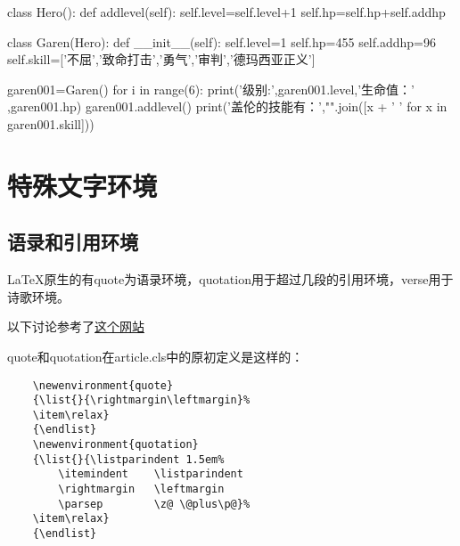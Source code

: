 \documentclass[11pt,oneside]{book}
\begin{document}
  \begin{tcbpython}[]
    class Hero():
    def addlevel(self):
    self.level=self.level+1
    self.hp=self.hp+self.addhp

    class Garen(Hero):
    def __init__(self):
    self.level=1
    self.hp=455
    self.addhp=96
    self.skill=['不屈','致命打击','勇气','审判','德玛西亚正义']

    garen001=Garen()
    for i in range(6):
    print('级别:',garen001.level,'生命值：' ,garen001.hp)
    garen001.addlevel()
    print('盖伦的技能有：',"".join([x + '  ' for x in garen001.skill]))
  \end{tcbpython}



  \chapter{特殊文字环境}
  \section{语录和引用环境}
  \LaTeX 原生的有quote为语录环境，quotation用于超过几段的引用环境，verse用于诗歌环境。

  以下讨论参考了\href{http://tex.stackexchange.com/questions/33219/whats-the-difference-between-the-environments-quote-and-quotation}{这个网站}

  quote和quotation在article.cls中的原初定义是这样的：
  \begin{Verbatim}
    \newenvironment{quote}
    {\list{}{\rightmargin\leftmargin}%
    \item\relax}
    {\endlist}
    \newenvironment{quotation}
    {\list{}{\listparindent 1.5em%
        \itemindent    \listparindent
        \rightmargin   \leftmargin
        \parsep        \z@ \@plus\p@}%
    \item\relax}
    {\endlist}
  \end{Verbatim}
\end{document}
